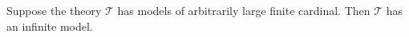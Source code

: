 Suppose the theory $\mathcal{T}$ has models of arbitrarily large finite cardinal. Then $\mathcal{T}$ has an infinite model.
